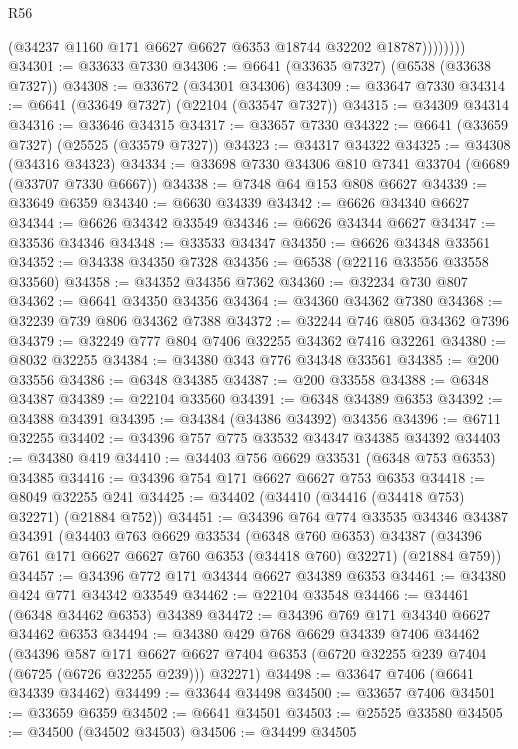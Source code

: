 \begin{lexlean}{R56}
\begin{coremodule}
                  (@34237 @1160 @171 @6627 @6627 @6353 @18744 @32202 @18787))))))))
@34301 := @33633 @7330
@34306 := @6641 (@33635 @7327) (@6538 (@33638 @7327))
@34308 := @33672 (@34301 @34306)
@34309 := @33647 @7330
@34314 := @6641 (@33649 @7327) (@22104 (@33547 @7327))
@34315 := @34309 @34314
@34316 := @33646 @34315
@34317 := @33657 @7330
@34322 := @6641 (@33659 @7327) (@25525 (@33579 @7327))
@34323 := @34317 @34322
@34325 := @34308 (@34316 @34323)
@34334 := @33698 @7330 @34306 @810 @7341 @33704 (@6689 (@33707 @7330 @6667))
@34338 := @7348 @64 @153 @808 @6627
@34339 := @33649 @6359
@34340 := @6630 @34339
@34342 := @6626 @34340 @6627
@34344 := @6626 @34342 @33549
@34346 := @6626 @34344 @6627
@34347 := @33536 @34346
@34348 := @33533 @34347
@34350 := @6626 @34348 @33561
@34352 := @34338 @34350 @7328
@34356 := @6538 (@22116 @33556 @33558 @33560)
@34358 := @34352 @34356 @7362
@34360 := @32234 @730 @807
@34362 := @6641 @34350 @34356
@34364 := @34360 @34362 @7380
@34368 := @32239 @739 @806 @34362 @7388
@34372 := @32244 @746 @805 @34362 @7396
@34379 := @32249 @777 @804 @7406 @32255 @34362 @7416 @32261
@34380 := @8032 @32255
@34384 := @34380 @343 @776 @34348 @33561
@34385 := @200 @33556
@34386 := @6348 @34385
@34387 := @200 @33558
@34388 := @6348 @34387
@34389 := @22104 @33560
@34391 := @6348 @34389 @6353
@34392 := @34388 @34391
@34395 := @34384 (@34386 @34392) @34356
@34396 := @6711 @32255
@34402 := @34396 @757 @775 @33532 @34347 @34385 @34392
@34403 := @34380 @419
@34410 := @34403 @756 @6629 @33531 (@6348 @753 @6353) @34385
@34416 := @34396 @754 @171 @6627 @6627 @753 @6353
@34418 := @8049 @32255 @241
@34425 := @34402 (@34410 (@34416 (@34418 @753) @32271) (@21884 @752))
@34451 := @34396
    @764
    @774
    @33535
    @34346
    @34387
    @34391
    (@34403
      @763
      @6629
      @33534
      (@6348 @760 @6353)
      @34387
      (@34396 @761 @171 @6627 @6627 @760 @6353 (@34418 @760) @32271)
      (@21884 @759))
@34457 := @34396 @772 @171 @34344 @6627 @34389 @6353
@34461 := @34380 @424 @771 @34342 @33549
@34462 := @22104 @33548
@34466 := @34461 (@6348 @34462 @6353) @34389
@34472 := @34396 @769 @171 @34340 @6627 @34462 @6353
@34494 := @34380
    @429
    @768
    @6629
    @34339
    @7406
    @34462
    (@34396
      @587
      @171
      @6627
      @6627
      @7404
      @6353
      (@6720 @32255 @239 @7404 (@6725 (@6726 @32255 @239)))
      @32271)
@34498 := @33647 @7406 (@6641 @34339 @34462)
@34499 := @33644 @34498
@34500 := @33657 @7406
@34501 := @33659 @6359
@34502 := @6641 @34501
@34503 := @25525 @33580
@34505 := @34500 (@34502 @34503)
@34506 := @34499 @34505

\end{coremodule}
\end{lexlean}
